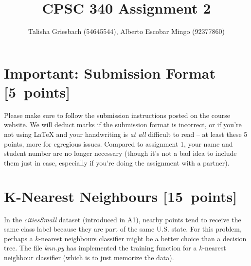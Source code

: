 \documentclass{article}
\newcommand{\blu}[1]{{\textcolor{blu}{#1}}}
\let\ask\blu
\newcommand\pts[1]{\textcolor{pointscolour}{[#1~points]}}
\begin{document}
    \title{CPSC 340 Assignment 2}
    \author{Talisha Griesbach (54645544), Alberto Escobar Mingo (92377860)}
    \date{}
    \maketitle
    \vspace{-4em}


    \section*{Important: Submission Format \pts{5}}

    Please make sure to follow the submission instructions posted on the course website.
    \ask{We will deduct marks if the submission format is incorrect, or if you're not using \LaTeX{} and your handwriting is \emph{at all} difficult to read} -- at least these 5 points, more for egregious issues.
    Compared to assignment 1, your name and student number are no longer necessary (though it's not a bad idea to include them just in case, especially if you're doing the assignment with a partner).

    \section{K-Nearest Neighbours \pts{15}}

    In the \emph{citiesSmall} dataset (introduced in A1), nearby points tend to receive the same class label because they are part of the same U.S. state. For this problem, perhaps a $k$-nearest neighbours classifier might be a better choice than a decision tree. The file \emph{knn.py} has implemented the training function for a $k$-nearest neighbour classifier (which is to just memorize the data).
\end{document}
